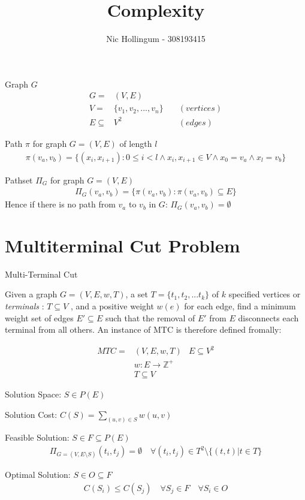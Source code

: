 \documentclass{article}
\author{Nic Hollingum - 308193415}
\title{Complexity}
\begin{document}
\begin{definition}
Graph $G$
\begin{align}
	\nonumber G = & (V,E) \\
	\nonumber V = & \{v_1, v_2, ..., v_n\} \quad & (vertices)\\
	\nonumber E \subseteq & V^2 & (edges)
\end{align}
\end{definition}

\begin{definition}
Path $\pi$ for graph $G = (V,E)$ of length $l$
\begin{align}
	\nonumber \pi(v_a, v_b) = \{(x_i, x_{i+1}) : 0 \leq i < l \wedge x_i, x_{i+1} \in V \wedge x_0 = v_a \wedge x_l = v_b\}
\end{align}
\end{definition}

\begin{definition}
Pathset $\Pi_G$ for graph $G = (V,E)$
\begin{align}
	\nonumber \Pi_G(v_a, v_b) = \{\pi(v_a, v_b) : \pi(v_a, v_b) \subseteq E\}
\end{align}
Hence if there is no path from $v_a$ to $v_b$ in $G$: $\Pi_G(v_a, v_b) = \emptyset$
\end{definition}


\section{Multiterminal Cut Problem}

\begin{definition}
Multi-Terminal Cut

Given a graph $G=(V,E,w,T)$, a set $T=\{t_1, t_2, ... t_k\}$ of $k$ specified vertices or {\em terminals} : $T \subseteq V$ , and a positive weight $w(e)$ for each edge, find a minimum weight set of edges $E' \subseteq E$ such that the removal of $E'$ from $E$ disconnects each terminal from all others.
An instance of MTC is therefore defined fromally:

\begin{align}
	\nonumber MTC = & (V,E,w,T)
	\nonumber & E \subseteq V^2\\
	\nonumber & w : E \rightarrow \mathbb{Z}^+\\
	\nonumber & T \subseteq V
\end{align}

Solution Space: $S \in P(E)$

Solution Cost: $C(S) = \displaystyle\sum\limits_{(u,v) \in S} w(u,v)$

Feasible Solution: $S \in F \subseteq P(E)$
\begin{align}
	\nonumber \Pi_{G=(V,E \setminus S)}(t_i, t_j) = \emptyset \quad \forall (t_i, t_j) \in T^2 \setminus \{(t, t) | t \in T\}
\end{align}

Optimal Solution: $S \in O \subseteq F$
\begin{align}
	\nonumber C(S_i) \leq C(S_j) \quad \forall S_j \in F \quad \forall S_i \in O
\end{align}

\end{definition}
\end{document}

